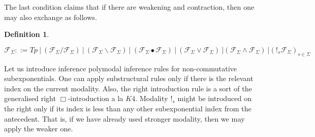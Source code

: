 \documentclass[a4paper]{article}
\theoremstyle{defin}
\newtheorem{defin}{Definition}
\theoremstyle{theorem}
\theoremstyle{prop}
\theoremstyle{lemma}
\theoremstyle{ex}
\theoremstyle{col}
\begin{document}
The last condition claims that if there are weakening and contraction, then one may also exchange as follows.

\begin{prooftree}
\end{prooftree}

\begin{defin}
$ $

  $\mathcal{F}_{\Sigma} ::= Tp \: | \: (\mathcal{F}_{\Sigma} / \mathcal{F}_{\Sigma}) \: | \: (\mathcal{F}_{\Sigma} \backslash
  \mathcal{F}_{\Sigma}) \: | \: (\mathcal{F}_{\Sigma} \bullet \mathcal{F}_{\Sigma}) \: | \: (\mathcal{F}_{\Sigma} \lor \mathcal{F}_{\Sigma}) \: | (\mathcal{F}_{\Sigma} \land \mathcal{F}_{\Sigma}) \: | ({!_s \mathcal{F}_{\Sigma}})_{s \in
  \Sigma} $
\end{defin}

Let us introduce inference polymodal inference rules for non-commutative subexponentials. One can apply substructural
rules only if there is the relevant index on the current modality. Also, the right introduction rule is a sort of the
generalised right $\Box$-introduction a la $K4$. Modality $!_s$ might be introduced on the right only if its index is less than any other subexponential index from the antecedent. That is, if we have already used stronger modality, then we may
apply the weaker one.
\end{document}
